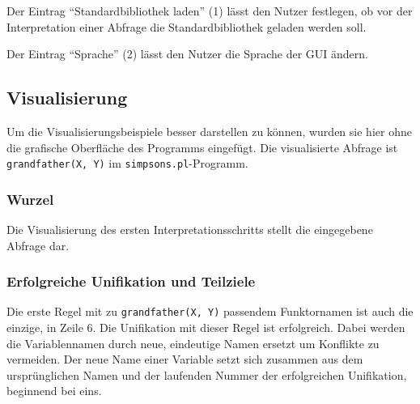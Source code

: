 \documentclass[parskip=full,11pt,twoside]{scrartcl}
\begin{document}
\begin{minipage}{\linewidth}
\end{minipage}

Der Eintrag \enquote{Standardbibliothek laden} (1) lässt den Nutzer festlegen, ob vor der Interpretation einer Abfrage die Standardbibliothek geladen werden soll.

Der Eintrag \enquote{Sprache} (2) lässt den Nutzer die Sprache der GUI ändern.

\subsection{Visualisierung}

Um die Visualisierungsbeispiele besser darstellen zu können, wurden sie hier ohne die grafische Oberfläche des Programms eingefügt.
Die visualisierte Abfrage ist \texttt{grandfather(X, Y)} im \texttt{simpsons.pl}-Programm.

\subsubsection{Wurzel}

\begin{minipage}{\linewidth}
\end{minipage}

Die Visualisierung des ersten Interpretationsschritts stellt die eingegebene Abfrage dar.

\subsubsection{Erfolgreiche Unifikation und Teilziele}

Die erste Regel mit zu \texttt{grandfather(X, Y)} passendem Funktornamen ist auch die einzige, in Zeile 6.
Die Unifikation mit dieser Regel ist erfolgreich.
Dabei werden die Variablennamen durch neue, eindeutige Namen ersetzt um Konflikte zu vermeiden.
Der neue Name einer Variable setzt sich zusammen aus dem ursprünglichen Namen und der laufenden Nummer der erfolgreichen Unifikation, beginnend bei eins.

\begin{minipage}{\linewidth}
\end{minipage}
\end{document}
